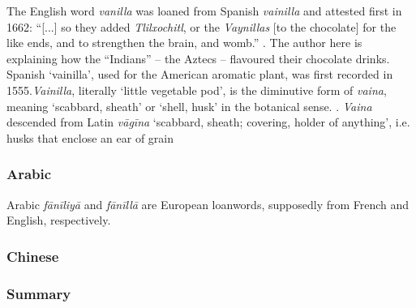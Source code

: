 The English word \textit{vanilla} was loaned from Spanish \textit{vainilla} and attested first in 1662: ``[...] so they added \textit{Tlilxochitl}, or the \textit{Vaynillas} [to the chocolate] for the like ends, and to strengthen the brain, and womb.'' \parencite[11]{stubbe_indian_1662}. The author here is explaining how the ``Indians'' -- the Aztecs -- flavoured their chocolate drinks. Spanish `vainilla', used for the American aromatic plant,  was first recorded in 1555.\textit{Vainilla}, literally `little vegetable pod', is the diminutive form of \textit{vaina}, meaning `scabbard, sheath' or `shell, husk' in the botanical sense.  \parencites[596]{corominas_breve_1987}[538]{gomez_de_silva_elseviers_1985}. \textit{Vaina} descended from Latin \textit{vāgīna} `scabbard, sheath; covering, holder of anything', i.e. husks that enclose an ear of grain 



\subsubsection{Arabic}



Arabic \textit{fānīliyā} and \textit{fānīllā} are European loanwords, supposedly from French and English, respectively.




\subsubsection{Chinese}





\subsubsection{Summary}


















